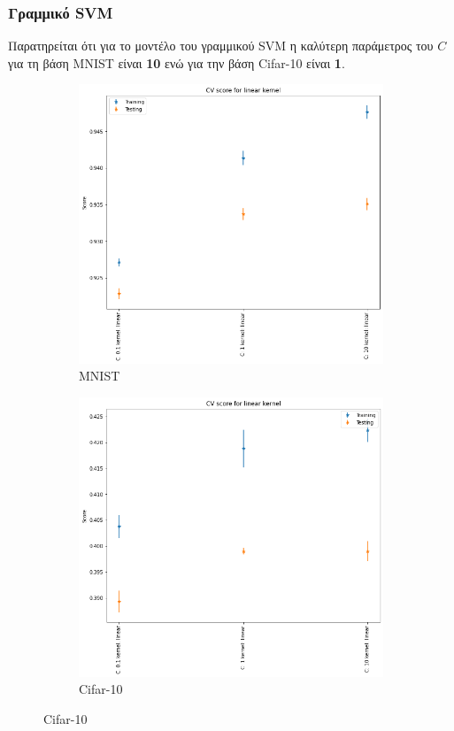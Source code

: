 \documentclass{beamer}
\begin{document}
\begin{frame}
\frametitle{Γραμμικό SVM}

Παρατηρείται ότι για το μοντέλο του γραμμικού SVM η καλύτερη παράμετρος του $C$
για τη βάση MNIST είναι {\bf10} ενώ για την βάση Cifar-10 είναι {\bf1}.

\begin{figure}[H]
    \centering

    \begin{subfigure}[t]{0.45\linewidth}
    \includegraphics[width=\linewidth]{figures/mnist/cv_results_linear.png}
    \caption{MNIST}
    \end{subfigure}
    \begin{subfigure}[t]{0.45\linewidth}
    \includegraphics[width=\linewidth]{figures/cifar/cv_results_linear.png}
    \caption{Cifar-10}
    \end{subfigure}


\end{figure}
\end{frame}
\end{document}
